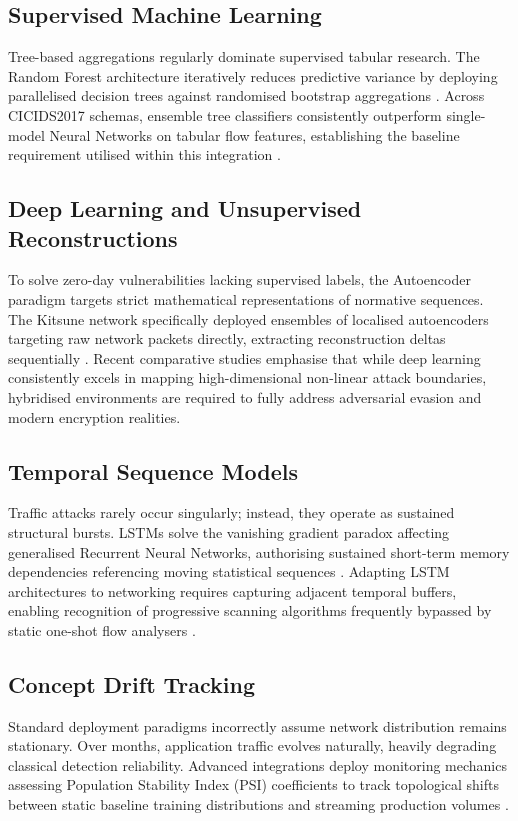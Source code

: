 \documentclass[conference]{IEEEtran}
\begin{document}
\subsection{Supervised Machine Learning}
Tree-based aggregations regularly dominate supervised tabular research. The Random Forest architecture iteratively reduces predictive variance by deploying parallelised decision trees against randomised bootstrap aggregations \cite{breiman2001random}. Across CICIDS2017 schemas, ensemble tree classifiers consistently outperform single-model Neural Networks on tabular flow features, establishing the baseline requirement utilised within this integration \cite{chen2016xgboost}.

\subsection{Deep Learning and Unsupervised Reconstructions}
To solve zero-day vulnerabilities lacking supervised labels, the Autoencoder paradigm targets strict mathematical representations of normative sequences. The Kitsune network specifically deployed ensembles of localised autoencoders targeting raw network packets directly, extracting reconstruction deltas sequentially \cite{mirsky2018kitsune}. Recent comparative studies \cite{ferrag2020, gamage2020} emphasise that while deep learning consistently excels in mapping high-dimensional non-linear attack boundaries, hybridised environments are required to fully address adversarial evasion and modern encryption realities.

\subsection{Temporal Sequence Models}
Traffic attacks rarely occur singularly; instead, they operate as sustained structural bursts. LSTMs solve the vanishing gradient paradox affecting generalised Recurrent Neural Networks, authorising sustained short-term memory dependencies referencing moving statistical sequences \cite{hochreiter1997lstm}. Adapting LSTM architectures to networking requires capturing adjacent temporal buffers, enabling recognition of progressive scanning algorithms frequently bypassed by static one-shot flow analysers \cite{nids_lstm}.

\subsection{Concept Drift Tracking}
Standard deployment paradigms incorrectly assume network distribution remains stationary. Over months, application traffic evolves naturally, heavily degrading classical detection reliability. Advanced integrations deploy monitoring mechanics assessing Population Stability Index (PSI) coefficients to track topological shifts between static baseline training distributions and streaming production volumes \cite{psi_concept_drift}.
\end{document}
